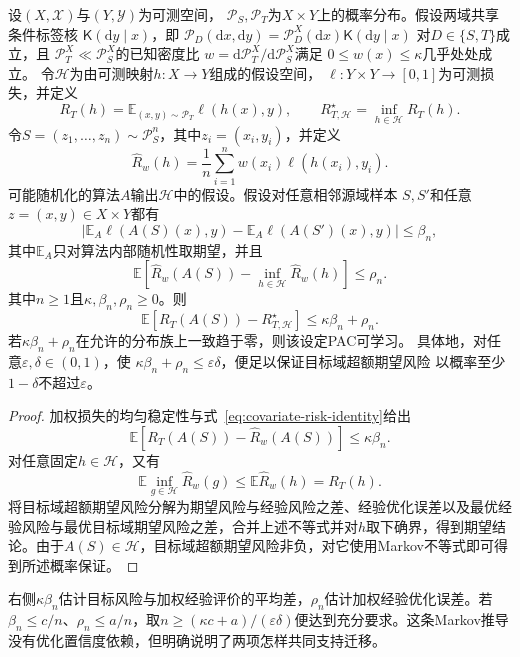 \begin{theorem}[稳定性条件下的迁移可学习性]
\label{thm:transfer-stability-learning}
设$(X,\mathcal X)$与$(Y,\mathcal Y)$为可测空间，
$\mathcal P_S,\mathcal P_T$为$X\times Y$上的概率分布。假设两域共享条件标签核
$\mathsf K(\mathrm dy\mid x)$，即
$\mathcal P_D(\mathrm dx,\mathrm dy)
=\mathcal P_D^X(\mathrm dx)\mathsf K(\mathrm dy\mid x)$
对$D\in\{S,T\}$成立，且
$\mathcal P_T^X\ll\mathcal P_S^X$的已知密度比
$w=\mathrm d\mathcal P_T^X/\mathrm d\mathcal P_S^X$满足
$0\leq w(x)\leq\kappa$几乎处处成立。
令$\mathcal H$为由可测映射$h:X\to Y$组成的假设空间，
$\ell:Y\times Y\to[0,1]$为可测损失，并定义
\[
 R_T(h)=\mathbb E_{(x,y)\sim\mathcal P_T}\ell(h(x),y),\qquad
 R_{T,\mathcal H}^{\star}=\inf_{h\in\mathcal H}R_T(h).
\]
令$S=(z_1,\ldots,z_n)\sim\mathcal P_S^n$，其中$z_i=(x_i,y_i)$，并定义
\[
 \hat R_w(h)=\frac1n\sum_{i=1}^n w(x_i)\ell(h(x_i),y_i).
\]
可能随机化的算法$A$输出$\mathcal H$中的假设。假设对任意相邻源域样本
$S,S'$和任意$z=(x,y)\in X\times Y$都有
\[
 \left|\mathbb E_A\ell(A(S)(x),y)
 -\mathbb E_A\ell(A(S')(x),y)\right|\leq\beta_n,
\]
其中$\mathbb E_A$只对算法内部随机性取期望，并且
\[
 \mathbb E\!\left[\hat R_w(A(S))-
                  \inf_{h\in\mathcal H}\hat R_w(h)\right]
 \leq\rho_n.
\]
其中$n\geq1$且$\kappa,\beta_n,\rho_n\geq0$。则
\begin{equation}
 \mathbb E[R_T(A(S))-R_{T,\mathcal H}^{\star}]
 \leq\kappa\beta_n+\rho_n.
 \label{eq:transfer-stability-excess}
\end{equation}
若$\kappa\beta_n+\rho_n$在允许的分布族上一致趋于零，则该设定PAC可学习。
具体地，对任意$\varepsilon,\delta\in(0,1)$，使
$\kappa\beta_n+\rho_n\leq\varepsilon\delta$，便足以保证目标域超额期望风险
以概率至少$1-\delta$不超过$\varepsilon$。
\end{theorem}
\begin{proof}
加权损失的均匀稳定性与式~\eqref{eq:covariate-risk-identity}给出
\[
 \mathbb E[R_T(A(S))-\hat R_w(A(S))]\leq\kappa\beta_n.
\]
对任意固定$h\in\mathcal H$，又有
\[
 \mathbb E\inf_{g\in\mathcal H}\hat R_w(g)
 \leq\mathbb E\hat R_w(h)=R_T(h).
\]
将目标域超额期望风险分解为期望风险与经验风险之差、经验优化误差以及最优经验风险与最优目标域期望风险之差，合并上述不等式并对$h$取下确界，得到期望结论。由于$A(S)\in\mathcal H$，目标域超额期望风险非负，对它使用Markov不等式即可得到所述概率保证。
\end{proof}

右侧$\kappa\beta_n$估计目标风险与加权经验评价的平均差，$\rho_n$估计加权经验优化误差。若$\beta_n\leq c/n$、$\rho_n\leq a/n$，取$n\geq(\kappa c+a)/(\varepsilon\delta)$便达到充分要求。这条Markov推导没有优化置信度依赖，但明确说明了两项怎样共同支持迁移。

